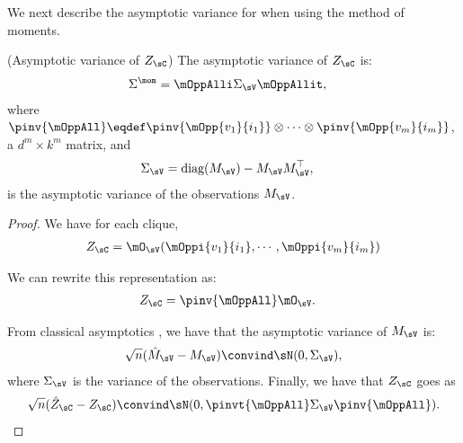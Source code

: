We next describe the asymptotic variance for \LearnClique when using the
  method of moments.
\begin{lemma}(Asymptotic variance of $Z_\sC$)
  \label{lem:mom-variance}  
  The asymptotic variance of $Z_\sC$ is:
  \begin{align*}
    \Sigma^{\mom} &= \mOppAlli \Sigma_\sV \mOppAllit,
  \end{align*}
  where $\pinv{\mOppAll} \eqdef \pinv{\mOpp{v_1}{i_1}} \otimes
  \cdots \otimes \pinv{\mOpp{v_m}{i_m}}$, a $d^m \times k^m$ matrix, and 
\begin{align*}
  \Sigma_\sV &= \text{\rm diag}(M_\sV) - M_\sV M_\sV^\top,
\end{align*}
  is the asymptotic variance of the observations $M_\sV$.
\end{lemma}
\begin{proof}
We have for each clique,
\begin{align*}
  Z_{\sC} &= \mO_\sV(\mOppi{v_1}{i_1},\cdots,\mOppi{v_m}{i_m}) \\
\end{align*}

We can rewrite this representation as:
\begin{align*}
  Z_{\sC} &= \pinv{\mOppAll} \mO_\sV.
\end{align*}

From classical asymptotics \cite{vaart98asymptotic},
we have that the asymptotic variance of $M_\sV$ is:
\begin{align*}
  \sqrt{n}(\hat M_\sV - M_\sV) \convind \sN(0, \Sigma_\sV),
\end{align*}
where $\Sigma_\sV$ is the variance of the observations. 
Finally, we have that $Z_\sC$ goes as
\begin{align*}
  \sqrt{n}(\hat Z_\sC - Z_\sC) \convind \sN(0, \pinvt{\mOppAll} \Sigma_\sV \pinv{\mOppAll}).
\end{align*}
\end{proof}


